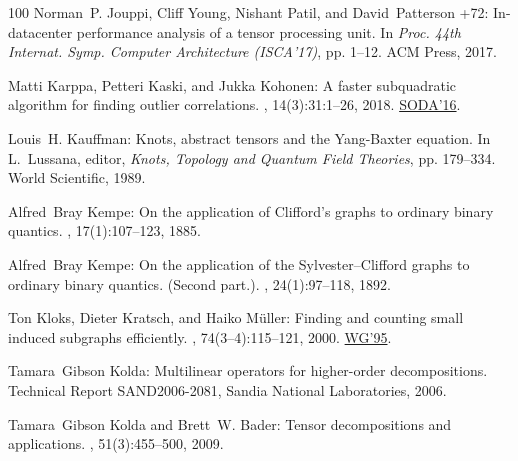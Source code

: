 \begin{thebibliography}{100}
{\sc Norman~P. Jouppi, Cliff Young, Nishant Patil, and David~Patterson +72}:
  In-datacenter performance analysis of a tensor processing unit.
\newblock In {\em Proc. 44th Internat. Symp. Computer Architecture (ISCA'17)},
  pp. 1--12. ACM Press, 2017.

{\sc Matti Karppa, Petteri Kaski, and Jukka Kohonen}: A faster subquadratic
  algorithm for finding outlier correlations.
, 14(3):31:1--26, 2018.
\newblock \prelim \href{https://doi.org/10.1137/1.9781611974331.ch90}{SODA'16}.

{\sc Louis~H. Kauffman}: Knots, abstract tensors and the {Y}ang-{B}axter
  equation.
\newblock In {\sc L.~Lussana}, editor, {\em Knots, Topology and Quantum Field
  Theories}, pp. 179--334. World Scientific, 1989.

{\sc Alfred~Bray Kempe}: On the application of {C}lifford's graphs to ordinary
  binary quantics.
, 17(1):107--123, 1885.

{\sc Alfred~Bray Kempe}: On the application of the {S}ylvester--{C}lifford
  graphs to ordinary binary quantics. ({S}econd part.).
, 24(1):97--118, 1892.

{\sc Ton Kloks, Dieter Kratsch, and Haiko M{\"{u}}ller}: Finding and counting
  small induced subgraphs efficiently.
, 74(3--4):115--121, 2000.
\newblock \prelim \href{https://doi.org/10.1007/3-540-60618-1\_62}{WG'95}.
\newblock [\epfmtdoi{10.1016/S0020-0190(00)00047-8}]

{\sc Tamara~Gibson Kolda}: Multilinear operators for higher-order
  decompositions.
\newblock Technical Report SAND2006-2081, Sandia National Laboratories, 2006.
\newblock [\epfmtdoi{10.2172/923081}]

{\sc Tamara~Gibson Kolda and Brett~W. Bader}: Tensor decompositions and
  applications.
, 51(3):455--500, 2009.
\newblock [\epfmtdoi{10.1137/07070111X}]


\end{thebibliography}
